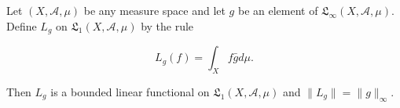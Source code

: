 Let $(X, \mathcal{A}, \mu)$ be any measure space and let $g$ be an element of $\mathfrak{L}_\infty(X, \mathcal{A}, \mu)$. Define $L_g$ on $\mathfrak{L}_1(X, \mathcal{A}, \mu)$ by the rule

$$L_g(f) = \int_X f \bar{g} d\mu.$$

Then $L_g$ is a bounded linear functional on $\mathfrak{L}_1(X, \mathcal{A}, \mu)$ and $\|L_g\| = \|g\|_\infty$.
